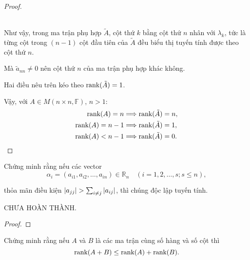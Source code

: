 \documentclass[class=linearalgebra,crop=false]{standalone}
\begin{document}
\begin{proof}
\begin{enumerate}[label = \textbf{Trường hợp \arabic*.},itemindent=2cm]
\begin{align*}
              \end{align*}
              \par Như vậy, trong ma trận phụ hợp $\tilde{A}$, cột thứ $k$ bằng cột thứ $n$ nhân với $\lambda_{k}$, tức là từng cột trong $(n-1)$ cột đầu tiên của $\tilde{A}$ đều biểu thị tuyến tính được theo cột thứ $n$.
              \par Mà $\tilde{a}_{nn}\ne 0$ nên cột thứ $n$ của ma trận phụ hợp khác không.
              \par Hai điều nêu trên kéo theo $\text{rank}(\tilde{A}) = 1$.
    \end{enumerate}

    \par Vậy, với $A\in M(n\times n,\mathbb{F})$, $n > 1$:
    \begin{align*}
        \text{rank}(A) = n   & \Longrightarrow \text{rank}(\tilde{A}) = n, \\
        \text{rank}(A) = n-1 & \Longrightarrow \text{rank}(\tilde{A}) = 1, \\
        \text{rank}(A) < n-1 & \Longrightarrow \text{rank}(\tilde{A}) = 0.
    \end{align*}
\end{proof}

\begin{exercise}
    \par Chứng minh rằng nếu các vector
    \[
        \alpha_{i} = (a_{i1}, a_{i2}, \ldots, a_{in})\in\mathbb{R}_{n}\quad (i = 1, 2, \ldots, s; s\le n),
    \]
    \par thỏa mãn điều kiện $\left|{a_{jj}}\right| > \sum_{i\ne j}\left|{a_{ij}}\right|$, thì chúng độc lập tuyến tính.
\end{exercise}

\par\MakeUppercase{Chưa hoàn thành}.

\begin{proof}
\end{proof}

\begin{exercise}\label{chapter3:rank-of-sum}
    \par Chứng minh rằng nếu $A$ và $B$ là các ma trận cùng số hàng và số cột thì
    \[
        \text{rank}(A + B)\le \text{rank}(A) + \text{rank}(B).
    \]
\end{exercise}
\end{document}

